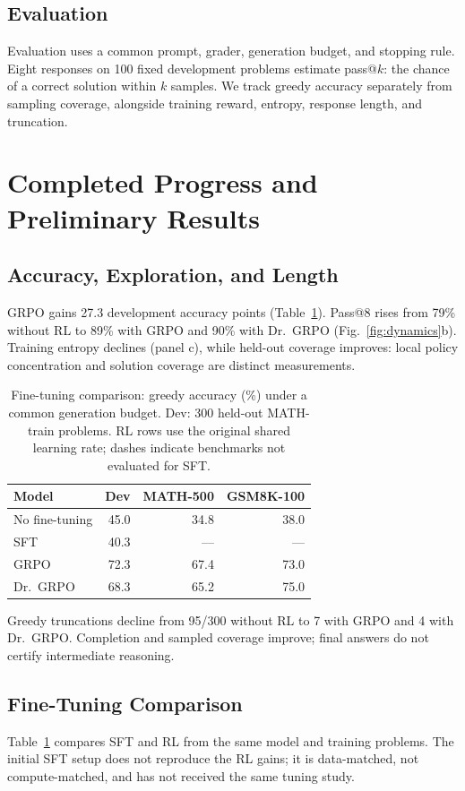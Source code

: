\documentclass[conference]{IEEEtran}
\begin{document}
\subsection{Evaluation}
Evaluation uses a common prompt, grader, generation budget, and stopping rule. Eight responses on 100 fixed development problems estimate pass@$k$: the chance of a correct solution within $k$ samples. We track greedy accuracy separately from sampling coverage, alongside training reward, entropy, response length, and truncation.

\section{Completed Progress and Preliminary Results}
\subsection{Accuracy, Exploration, and Length}
GRPO gains 27.3 development accuracy points (Table~\ref{tab:main}). Pass@8 rises from 79\% without RL to 89\% with GRPO and 90\% with Dr.~GRPO (Fig.~\ref{fig:dynamics}b). Training entropy declines (panel c), while held-out coverage improves: local policy concentration and solution coverage are distinct measurements.

\begin{table}[ht]
\caption{Fine-tuning comparison: greedy accuracy (\%) under a common generation budget. Dev: 300 held-out MATH-train problems. RL rows use the original shared learning rate; dashes indicate benchmarks not evaluated for SFT.}
\label{tab:main}
\centering
\footnotesize
\setlength{\tabcolsep}{4pt}
\begin{tabular}{lrrr}
\toprule
Model & Dev & MATH-500 & GSM8K-100\\
\midrule
No fine-tuning & 45.0 & 34.8 & 38.0\\
SFT & 40.3 & --- & ---\\
GRPO & 72.3 & 67.4 & 73.0\\
Dr.~GRPO & 68.3 & 65.2 & 75.0\\
\bottomrule
\end{tabular}
\end{table}

Greedy truncations decline from 95/300 without RL to 7 with GRPO and 4 with Dr.~GRPO. Completion and sampled coverage improve; final answers do not certify intermediate reasoning.

\subsection{Fine-Tuning Comparison}
Table~\ref{tab:main} compares SFT and RL from the same model and training problems. The initial SFT setup does not reproduce the RL gains; it is data-matched, not compute-matched, and has not received the same tuning study.
\end{document}
